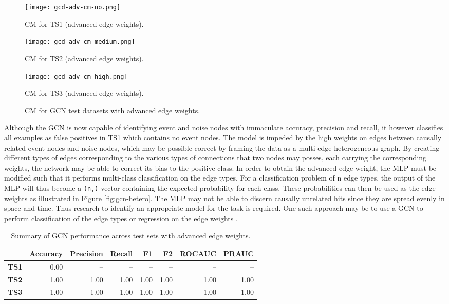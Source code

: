 \begin{figure}[htb]
  \centering
    \begin{minipage}{0.32\textwidth}
    \centering
    \texttt{[image: gcd-adv-cm-no.png]}
    \caption{CM for TS1 (advanced edge weights).}
  \end{minipage}
  \begin{minipage}{0.32\textwidth}
    \centering
    \texttt{[image: gcd-adv-cm-medium.png]}
    \caption{CM for TS2 (advanced edge weights).}
  \end{minipage}
  \begin{minipage}{0.32\textwidth}
    \centering
    \texttt{[image: gcd-adv-cm-high.png]}
    \caption{CM for TS3 (advanced edge weights).}
  \end{minipage}
  \caption{CM for GCN test datasets with advanced edge weights.}
  \label{fig:gcn-cm-adv}
\end{figure}

Although the GCN is now capable of identifying event and noise nodes
with immaculate accuracy, precision and recall, it however classifies
all examples as false positives in TS1 which contains no event nodes.
The model is impeded by the high weights on edges between causally
related event nodes and noise nodes, which may be possible correct by
framing the data as a multi-edge heterogeneous graph. By creating
different types of edges corresponding to the various types of
connections that two nodes may posses, each carrying the corresponding
weights, the network may be able to correct its bias to the positive
class. In order to obtain the advanced edge weight, the MLP must be
modified such that it performs multi-class classification on the edge
types. For a classification problem of n edge types, the output of the
MLP will thus become a \texttt{(n,)} vector containing the expected
probability for each class. These probabilities can then be used as
the edge weights as illustrated in Figure \ref{fig:gcn-hetero}. The
MLP may not be able to discern causally unrelated hits since they are
spread evenly in space and time. Thus research to identify an
appropriate model for the task is required. One such approach may be
to use a GCN to perform classification of the edge types or regression
on the edge weights \cite{gong2019exploiting}.

\begin{table}[htb]
  \centering
  \caption{Summary of GCN performance across test sets with advanced
    edge weights.}
  \begin{tabular}{lrrrrrrr}
    \hline
    & Accuracy & Precision & Recall & F1 & F2 & ROCAUC & PRAUC \\
    \hline
    \textbf{TS1} & 0.00 & -- & -- & -- & -- & -- & -- \\
    \textbf{TS2} & 1.00 & 1.00 & 1.00 & 1.00 & 1.00 & 1.00 & 1.00 \\
    \textbf{TS3} & 1.00 & 1.00 & 1.00 & 1.00 & 1.00 & 1.00 & 1.00 \\
    \hline
  \end{tabular}
  \label{tab:gcn-results-adv}
\end{table}

